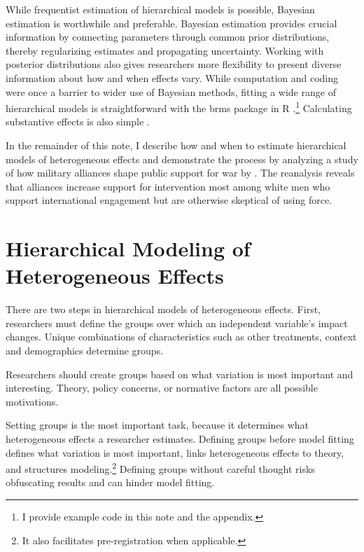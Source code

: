 \documentclass[12pt]{article}
\begin{document}
While frequentist estimation of hierarchical models is possible, Bayesian estimation is worthwhile and preferable. 
Bayesian estimation provides crucial information by connecting parameters through common prior distributions, thereby regularizing estimates and propagating uncertainty. 
Working with posterior distributions also gives researchers more flexibility to present diverse information about how and when effects vary. 
While computation and coding were once a barrier to wider use of Bayesian methods, fitting a wide range of hierarchical models is straightforward with the brms package in \textsf{R} \citep{Buerkner2017}.\footnote{I provide example code in this note and the appendix.}
Calculating substantive effects is also simple \citep{ArelBundockme}.



In the remainder of this note, I describe how and when to estimate hierarchical models of heterogeneous effects and demonstrate the process by analyzing a study of how military alliances shape public support for war by \citet{TomzWeeks2021}. 
The reanalysis reveals that alliances increase support for intervention most among white men who support international engagement but are otherwise skeptical of using force. 



\section{Hierarchical Modeling of Heterogeneous Effects}


There are two steps in hierarchical models of heterogeneous effects. 
First, researchers must define the groups over which an independent variable's impact changes. 
Unique combinations of characteristics such as other treatments, context and demographics determine groups.


Researchers should create groups based on what variation is most important and interesting. 
Theory, policy concerns, or normative factors are all possible motivations. 


Setting groups is the most important task, because it determines what heterogeneous effects a researcher estimates. 
Defining groups before model fitting defines what variation is most important, links heterogeneous effects to theory, and structures modeling.\footnote{It also facilitates pre-registration when applicable.}
Defining groups without careful thought risks obfuscating results and can hinder model fitting.   
\end{document}
